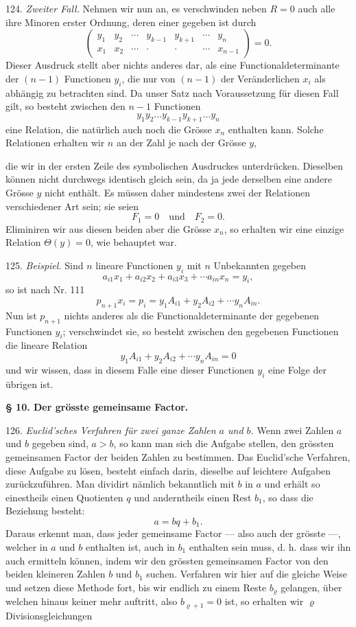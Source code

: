 \documentclass[11pt]{article}
\providecommand{\weberpage}[1]{}
\let\Theta\varTheta
\begin{document}
124. \textit{Zweiter Fall.} Nehmen wir nun an, es verschwinden neben $R = 0$ auch alle ihre Minoren erster Ordnung, deren einer gegeben ist durch
\[
\begin{pmatrix} y_1 & y_2 & \cdots & y_{k-1} & y_{k+1} & \cdots & y_n \\ x_1 & x_2 & \cdots & \cdot & \cdot & \cdots & x_{n-1} \end{pmatrix} = 0.
\]
Dieser Ausdruck stellt aber nichts anderes dar, als eine Functionaldeterminante der $(n-1)$ Functionen $y_i$, die nur von $(n-1)$ der Veränderlichen $x_i$ als abhängig zu betrachten sind. Da unser Satz nach Voraussetzung für diesen Fall gilt, so besteht zwischen den $n-1$ Functionen
\[
y_1 y_2 \ldots y_{k-1} y_{k+1} \ldots y_n
\]
eine Relation, die natürlich auch noch die Grösse $x_n$ enthalten kann. Solche Relationen erhalten wir $n$ an der Zahl je nach der Grösse $y$,


\weberpage{131}
die wir in der ersten Zeile des symbolischen Ausdruckes unterdrücken. Dieselben können nicht durchwegs identisch gleich sein, da ja jede derselben eine andere Grösse $y$ nicht enthält. Es müssen daher mindestens zwei der Relationen verschiedener Art sein; sie seien
\[ F_1 = 0 \quad \text{und} \quad F_2 = 0. \]
Eliminiren wir aus diesen beiden aber die Grösse $x_n$, so erhalten wir eine einzige Relation $\Theta(y) = 0$, wie behauptet war.

125. \textit{Beispiel.} Sind $n$ lineare Functionen $y_i$ mit $n$ Unbekannten gegeben
\[ a_{i1} x_1 + a_{i2} x_2 + a_{i3} x_3 + \cdots a_{in} x_n = y_i, \]
so ist nach Nr. 111
\[ p_{n+1} x_i = p_i = y_1 A_{i1} + y_2 A_{i2} + \cdots y_n A_{in}. \]
Nun ist $p_{n+1}$ nichts anderes als die Functionaldeterminante der gegebenen Functionen $y_i$; verschwindet sie, so besteht zwischen den gegebenen Functionen die lineare Relation
\[ y_1 A_{i1} + y_2 A_{i2} + \cdots y_n A_{in} = 0 \]
und wir wissen, dass in diesem Falle eine dieser Functionen $y_i$ eine Folge der übrigen ist.

\textbf{§ 10. Der grösste gemeinsame Factor.}

126. \textit{Euclid'sches Verfahren für zwei ganze Zahlen $a$ und $b$.} Wenn zwei Zahlen $a$ und $b$ gegeben sind, $a > b$, so kann man sich die Aufgabe stellen, den grössten gemeinsamen Factor der beiden Zahlen zu bestimmen. Das Euclid'sche Verfahren, diese Aufgabe zu lösen, besteht einfach darin, dieselbe auf leichtere Aufgaben zurückzuführen. Man dividirt nämlich bekanntlich mit $b$ in $a$ und erhält so einestheils einen Quotienten $q$ und anderntheils einen Rest $b_1$, so dass die Beziehung besteht:
\[ a = bq + b_1. \]
Daraus erkennt man, dass jeder gemeinsame Factor — also auch der grösste —, welcher in $a$ und $b$ enthalten ist, auch in $b_1$ enthalten sein muss, d. h. dass wir ihn auch ermitteln können, indem wir den grössten gemeinsamen Factor von den beiden kleineren Zahlen $b$ und $b_1$ suchen. Verfahren wir hier auf die gleiche Weise und setzen diese Methode fort, bis wir endlich zu einem Reste $b_\varrho$ gelangen, über welchen hinaus keiner mehr auftritt, also $b_{\varrho+1} = 0$ ist, so erhalten wir $\varrho$ Divisionsgleichungen
\end{document}
